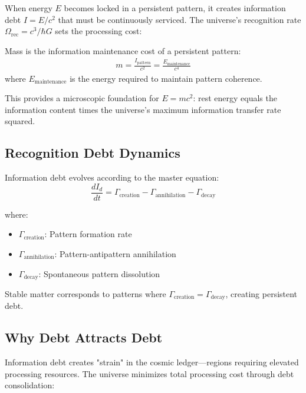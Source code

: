 \documentclass[12pt]{article}
\begin{document}
When energy $E$ becomes locked in a persistent pattern, it creates information debt $I = E/c^2$ that must be continuously serviced. The universe's recognition rate $\Omega_{\text{rec}} = c^3/\hbar G$ sets the processing cost:

\begin{definition}
Mass is the information maintenance cost of a persistent pattern:
\begin{align}
m = \frac{I_{\text{pattern}}}{c^2} = \frac{E_{\text{maintenance}}}{c^4}
\end{align}
where $E_{\text{maintenance}}$ is the energy required to maintain pattern coherence.
\end{definition}

This provides a microscopic foundation for $E = mc^2$: rest energy equals the information content times the universe's maximum information transfer rate squared.

\subsection{Recognition Debt Dynamics}

Information debt evolves according to the master equation:
\begin{equation}
\frac{dI_d}{dt} = \Gamma_{\text{creation}} - \Gamma_{\text{annihilation}} - \Gamma_{\text{decay}}
\end{equation}

where:
\begin{itemize}
\item $\Gamma_{\text{creation}}$: Pattern formation rate
\item $\Gamma_{\text{annihilation}}$: Pattern-antipattern annihilation  
\item $\Gamma_{\text{decay}}$: Spontaneous pattern dissolution
\end{itemize}

Stable matter corresponds to patterns where $\Gamma_{\text{creation}} = \Gamma_{\text{decay}}$, creating persistent debt.

\subsection{Why Debt Attracts Debt}

Information debt creates "strain" in the cosmic ledger—regions requiring elevated processing resources. The universe minimizes total processing cost through debt consolidation:
\end{document}
